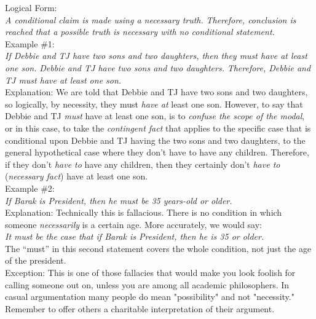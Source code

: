 \documentclass[a4paper,12pt,single,pdftex]{scrbook}
\begin{document}
    
      Logical Form:
    \\

    
      {\em A conditional claim is made using a necessary truth.} \newline
{\em Therefore, conclusion is reached that a possible truth is necessary with no conditional statement.}
    \\

    
      Example \#1:
    \\

    
      {\em If Debbie and TJ have two sons and two daughters, then they must have at least one son.} \newline
{\em Debbie and TJ have two sons and two daughters.} \newline
{\em Therefore, Debbie and TJ must have at least one son.}
    \\

    
      Explanation: We are told that Debbie and TJ have two sons and two daughters, so logically, by necessity, they must {\it have at} least one son.  However, to say that Debbie and TJ {\it must} have at least one son, is to {\it confuse the scope of the modal}, or in this case, to take the {\it contingent fact} that applies to the specific case that is conditional upon Debbie and TJ having the two sons and two daughters, to the general hypothetical case where they don’t have to have any children.  Therefore, if they don’t {\it have to} have any children, then they certainly don’t {\it have to} ({\it necessary fact}) have at least one son.
    \\

    
      Example \#2:
    \\

    
      {\em If Barak is President, then he must be 35 years-old or older.}
    \\

    
      Explanation: Technically this is fallacious.  There is no condition in which someone {\it necessarily} is a certain age.  More accurately, we would say:
    \\

    
      {\em It must be the case that if Barak is President, then he is 35 or older.}
    \\

    
      The “must” in this second statement covers the whole condition, not just the age of the president.
    \\

    
      Exception: This is one of those fallacies that would make you look foolish for calling someone out on, unless you are among all academic philosophers. In casual argumentation many people do mean "possibility" and not "necessity." Remember to offer others a charitable interpretation of their argument.
    \\
\end{document}
